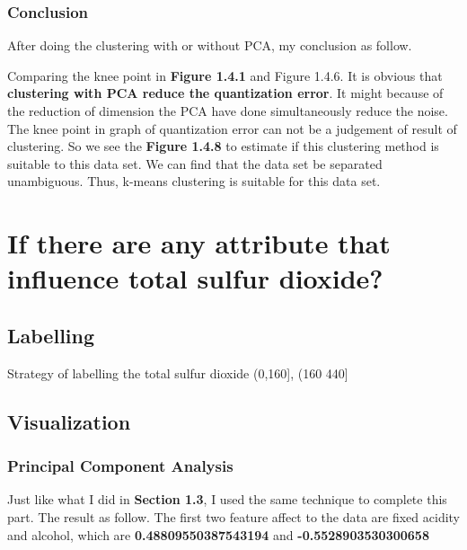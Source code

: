 \documentclass[titlepage,a4paper,12pt,thmsb]{report}
\begin{document}
{\newpage

\subsection{Conclusion}

After  doing the clustering with or without PCA, my conclusion as follow.

Comparing the knee point in {\bf Figure 1.4.1} and {Figure 1.4.6}. It is obvious that {\bf clustering with PCA reduce the quantization error}. It might because of the reduction of dimension the PCA have done simultaneously reduce the noise.
The knee point in graph of quantization error can not be a judgement of result of clustering. So we see the {\bf Figure 1.4.8} to estimate if this clustering method is suitable to this data set. We can find that the data set be separated unambiguous. Thus, k-means clustering is suitable for this data set.


\newpage




\chapter{If there are any attribute that influence total sulfur dioxide?}

\section{Labelling}

Strategy of labelling the total sulfur dioxide (0,160], (160 440]

\section{Visualization}

\subsection{Principal Component Analysis}

Just like what I did in {\bf{Section 1.3}}, I used the same technique to complete this part. 
The result as follow. The first two feature affect to the data are fixed acidity and alcohol, which are {\bf 0.48809550387543194} and {\bf  -0.5528903530300658}


}
\end{document}
